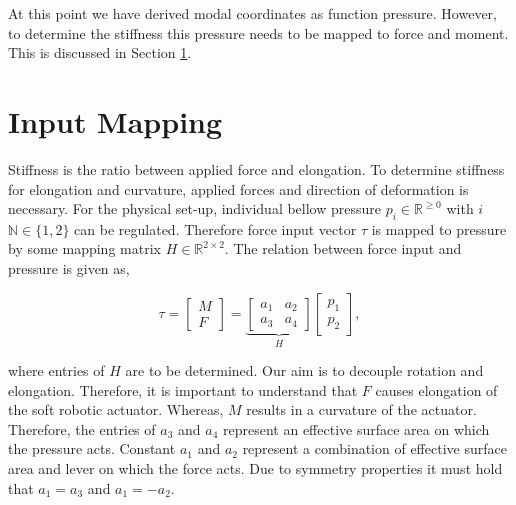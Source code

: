 At this point we have derived modal coordinates as function pressure. However, to determine the stiffness this pressure needs to be mapped to force and moment. This is discussed in Section \ref{sec3:InputMapping}.






\section{Input Mapping}
\label{sec3:InputMapping}

Stiffness is the ratio between applied force and elongation. To determine stiffness for elongation and curvature, applied forces and direction of deformation is necessary. For the physical set-up, individual bellow pressure $p_i \in \mathbb{R}^{\geq 0}$ with $i$ $\mathbb{N} \in \{1,2\}$ can be regulated. Therefore force input vector $\tau$ is mapped to pressure by some mapping matrix $H \in \mathbb{R}^{2 \times 2}$. The relation between force input and pressure is given as, 

\begin{equation}
   \tau =   \begin{bmatrix} M \\ F \end{bmatrix}     = \underbrace{\begin{bmatrix}  a_1 & a_2 \\ a_3 & a_4 \end{bmatrix}}_{H}         \begin{bmatrix}  p_1 \\ p_2 \end{bmatrix}, \label{eq3:H}
\end{equation}

where entries of $H$ are to be determined. Our aim is to decouple rotation and elongation. Therefore, it is important to understand that $F$ causes elongation of the soft robotic actuator. Whereas, $M$ results in a curvature of the actuator. Therefore, the entries of $a_3$ and $a_4$ represent an effective surface area on which the pressure acts. Constant $a_1$ and $a_2$ represent a combination of effective surface area and lever on which the force acts. Due to symmetry properties it must hold that $a_1 = a_3$ and $a_1 = -a_2$.

